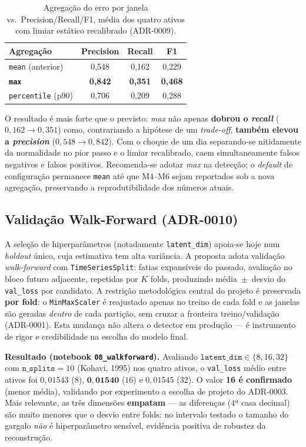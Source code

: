 \begin{table}[h]
\centering
\caption{Agregação do erro por janela vs.\ Precision/Recall/F1, média dos quatro ativos com
limiar estático recalibrado (ADR-0009).}
\label{tab:m8-pooling}
\begin{tabular}{lccc}
\toprule
\textbf{Agregação} & \textbf{Precision} & \textbf{Recall} & \textbf{F1} \\
\midrule
\texttt{mean} (anterior) & 0,548 & 0,162 & 0,229 \\
\textbf{\texttt{max}} & \textbf{0,842} & \textbf{0,351} & \textbf{0,468} \\
\texttt{percentile} (p90) & 0,706 & 0,209 & 0,288 \\
\bottomrule
\end{tabular}
\end{table}

\noindent O resultado é mais forte que o previsto: \emph{max} não apenas \textbf{dobrou o
\emph{recall}} ($0{,}162 \to 0{,}351$) como, contrariando a hipótese de um \emph{trade-off},
\textbf{também elevou a \emph{precision}} ($0{,}548 \to 0{,}842$). Com o choque de um dia
separando-se nitidamente da normalidade no pior passo e o limiar recalibrado, caem
simultaneamente falsos negativos e falsos positivos. Recomenda-se adotar \emph{max} na detecção;
o \emph{default} de configuração permanece \texttt{mean} até que M4--M6 sejam reportados sob a
nova agregação, preservando a reprodutibilidade dos números atuais.

\subsection{Validação Walk-Forward (ADR-0010)}
\label{sec:m8-walkforward}
A seleção de hiperparâmetros (notadamente \texttt{latent\_dim}) apoia-se hoje num \emph{holdout}
único, cuja estimativa tem alta variância. A proposta adota validação \emph{walk-forward} com
\texttt{TimeSeriesSplit}: fatias expansíveis do passado, avaliação no bloco futuro adjacente,
repetidas por $K$ folds, produzindo média~$\pm$~desvio do \texttt{val\_loss} por candidato. A
restrição metodológica central do projeto é preservada \textbf{por fold}: o \texttt{MinMaxScaler}
é reajustado apenas no treino de cada fold e as janelas são geradas \emph{dentro} de cada
partição, sem cruzar a fronteira treino/validação (ADR-0001). Esta mudança não altera o detector
em produção --- é instrumento de rigor e credibilidade na escolha do modelo final.

\par\noindent\textbf{Resultado (notebook \texttt{08\_walkforward}).} Avaliando
$\texttt{latent\_dim} \in \{8, 16, 32\}$ com $\texttt{n\_splits}=10$ (Kohavi, 1995) nos quatro
ativos, o \texttt{val\_loss} médio entre ativos foi $0{,}01543$ ($8$), $\mathbf{0{,}01540}$ ($16$)
e $0{,}01545$ ($32$). O valor \textbf{16 é confirmado} (menor média), validando por experimento a
escolha de projeto do ADR-0003. Mais relevante, as três dimensões \textbf{empatam} --- as
diferenças (4ª casa decimal) são muito menores que o desvio entre folds: no intervalo testado o
tamanho do gargalo \emph{não} é hiperparâmetro sensível, evidência positiva de robustez da
reconstrução.

